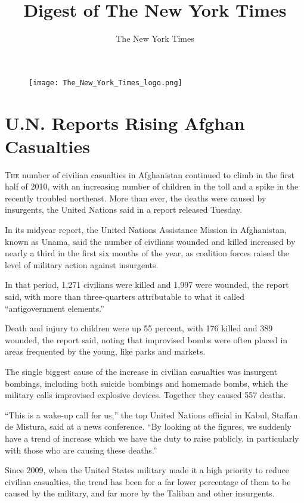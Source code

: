 ﻿\documentclass[12pt]{article}
\title{Digest of The New York Times}
\author{The New York Times}
\begin{document}
\date{}
\thispagestyle{empty}

\begin{figure}
\texttt{[image: The\_New\_York\_Times\_logo.png]}
\vspace{-15ex}
\end{figure}
\renewcommand\contentsname{}
{\footnotesize\textsf{\tableofcontents}}

\clearpage
\setcounter{page}{1}

\section{U.N. Reports Rising Afghan Casualties}

\lettrine{T}{he} number of civilian casualties in Afghanistan continued to
climb in the first half of 2010, with an increasing number of children in the toll and a spike in
the recently troubled northeast. More than ever, the deaths were caused by insurgents, the United
Nations said in a report released Tuesday.

In its midyear report, the United Nations Assistance Mission in Afghanistan, known as Unama, said
the number of civilians wounded and killed increased by nearly a third in the first six months of
the year, as coalition forces raised the level of military action against insurgents.

In that period, 1,271 civilians were killed and 1,997 were wounded, the report said, with more than
three-quarters attributable to what it called ``antigovernment elements.''

Death and injury to children were up 55 percent, with 176 killed and 389 wounded, the report said,
noting that improvised bombs were often placed in areas frequented by the young, like parks and
markets.

The single biggest cause of the increase in civilian casualties was insurgent bombings, including
both suicide bombings and homemade bombs, which the military calls improvised explosive devices.
Together they caused 557 deaths.

``This is a wake-up call for us,'' the top United Nations official in Kabul, Staffan de Mistura,
said at a news conference. ``By looking at the figures, we suddenly have a trend of increase which
we have the duty to raise publicly, in particularly with those who are causing these deaths.''

Since 2009, when the United States military made it a high priority to reduce civilian casualties,
the trend has been for a far lower percentage of them to be caused by the military, and far more by
the Taliban and other insurgents.
\end{document}
